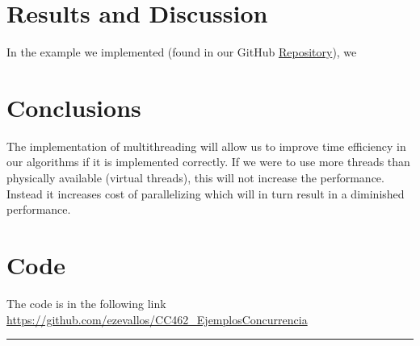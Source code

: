 \documentclass[10pt,a4paper]{article}
\theoremstyle{definition}
\begin{document}
\section{Results and Discussion}


In the example we implemented (found in our GitHub \href{https://github.com/ezevallos/CC462\_Battle-City}{Repository}), we 

\section{Conclusions}
The implementation of multithreading will allow us to improve time efficiency in our algorithms if it is implemented correctly. If we were to use more threads than physically available (virtual threads), this will not increase
the performance. Instead it increases cost of parallelizing which will in turn result in a diminished performance.
\section{Code}
The code is in the following link \url{https://github.com/ezevallos/CC462_EjemplosConcurrencia}



\vspace{20pt}
\hrule
\vspace{10pt}

\nocite{*}
%



\end{document}
